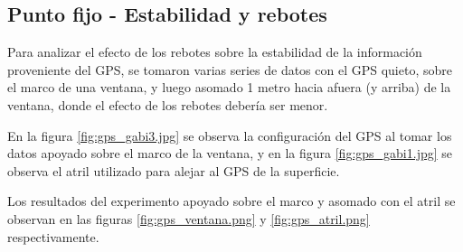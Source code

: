\documentclass[spanish,12pt,a4paper,titlepage]{report}
\begin{document}
\subsection{Punto fijo - Estabilidad y rebotes}
\label{sec:altura-punto-fijo-estabilidad}

Para analizar el efecto de los rebotes sobre la estabilidad de la información proveniente del GPS, se tomaron varias series de datos con el GPS quieto, sobre el marco de una ventana, y luego asomado 1 metro hacia afuera (y arriba) de la ventana, donde el efecto de los rebotes debería ser menor.

En la figura \ref{fig:gps_gabi3.jpg} se observa la configuración del GPS al tomar los datos apoyado sobre el marco de la ventana, y en la figura \ref{fig:gps_gabi1.jpg} se observa el atril utilizado para alejar al GPS de la superficie.

\begin{figure}[h!]
  \begin{center}
\hspace{50pt}
  \end{center}
\end{figure}

Los resultados del experimento apoyado sobre el marco y asomado con el atril se observan en las figuras \ref{fig:gps_ventana.png} y \ref{fig:gps_atril.png} respectivamente.
\end{document}

